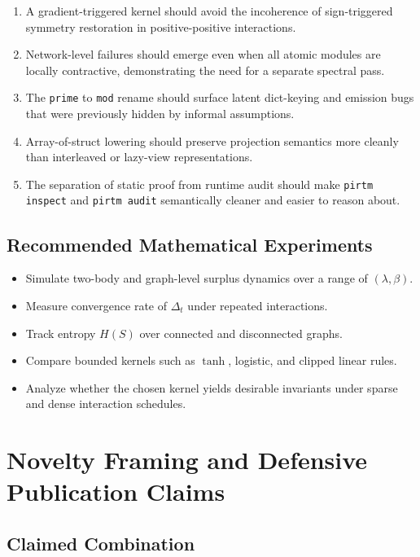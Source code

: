 \documentclass[11pt]{article}
\begin{document}
\begin{enumerate}[leftmargin=2em]
  \item A gradient-triggered kernel should avoid the incoherence of sign-triggered symmetry restoration in positive-positive interactions.
  \item Network-level failures should emerge even when all atomic modules are locally contractive, demonstrating the need for a separate spectral pass.
  \item The \texttt{prime} to \texttt{mod} rename should surface latent dict-keying and emission bugs that were previously hidden by informal assumptions.
  \item Array-of-struct lowering should preserve projection semantics more cleanly than interleaved or lazy-view representations.
  \item The separation of static proof from runtime audit should make \texttt{pirtm inspect} and \texttt{pirtm audit} semantically cleaner and easier to reason about.
\end{enumerate}

\subsection{Recommended Mathematical Experiments}

\begin{itemize}[leftmargin=2em]
  \item Simulate two-body and graph-level surplus dynamics over a range of \((\lambda,\beta)\).
  \item Measure convergence rate of \(\Delta_t\) under repeated interactions.
  \item Track entropy \(H(S)\) over connected and disconnected graphs.
  \item Compare bounded kernels such as \(\tanh\), logistic, and clipped linear rules.
  \item Analyze whether the chosen kernel yields desirable invariants under sparse and dense interaction schedules.
\end{itemize}

\section{Novelty Framing and Defensive Publication Claims}

\subsection{Claimed Combination}
\end{document}
